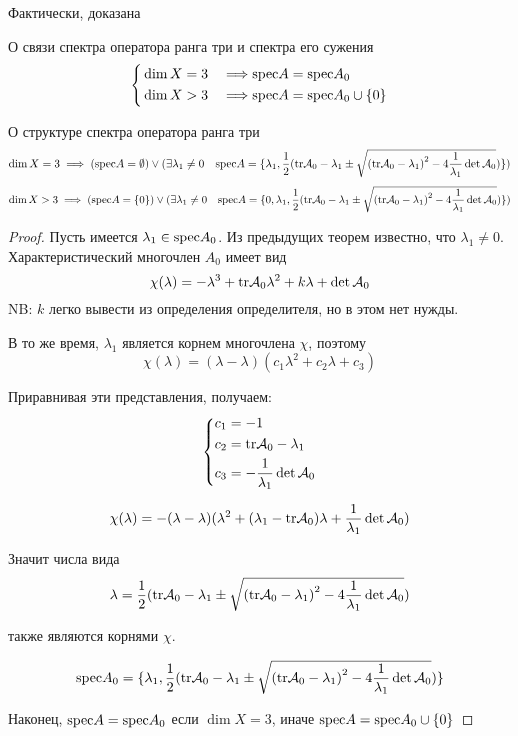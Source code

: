 Фактически, доказана
\begin{thm}{О связи спектра оператора ранга три и спектра его сужения}
  \begin{equation*}
    \left\{\begin{aligned}
      & \dim X = 3 & \implies & \mathrm{spec} A = \mathrm{spec} A_0 \\
      & \dim X > 3 & \implies & \mathrm{spec} A = \mathrm{spec} A_0 \cup \{0\}
    \end{aligned}\right.\end{equation*}
\end{thm}

\begin{thm}{О структуре спектра оператора ранга три}\*
  \label{thm:specstr}
  $$
  \dim X = 3 \implies
  (\mathrm{spec} A = \emptyset)
  \lor (\exists \lambda_1 \neq 0 \quad
  \mathrm{spec} A = \{\lambda_1,
    \frac{1}{2} (\mathrm{tr}\mathcal A_0 - \lambda_1
    \pm\sqrt{ {(\mathrm{tr}\mathcal A_0 - \lambda_1)}^2 - 4\frac{1}{\lambda_1} \det\mathcal A_0 })
  \})$$
  $$
  \dim X > 3 \implies
  (\mathrm{spec} A = \{0\})
  \lor (\exists \lambda_1 \neq 0 \quad
  \mathrm{spec} A = \{0, \lambda_1,
    \frac{1}{2} (\mathrm{tr}\mathcal A_0 - \lambda_1
    \pm\sqrt{ {(\mathrm{tr}\mathcal A_0 - \lambda_1)}^2 - 4\frac{1}{\lambda_1} \det\mathcal A_0 })
  \})$$
\end{thm}
\begin{proof}
  Пусть имеется $\lambda_1\in\mathrm{spec} A_0$.
  Из предыдущих теорем известно, что $\lambda_1\neq 0$.
  Характеристический многочлен $A_0$ имеет вид
  $$\chi(\lambda) = -\lambda^3 + \mathrm{tr}\mathcal A_0 \lambda^2 + k\lambda + \det\mathcal A_0$$
  NB: $k$ легко вывести из определения определителя, но в этом нет нужды.

  В то же время, $\lambda_1$ является корнем многочлена $\chi$, поэтому
  $$\chi(\lambda) = (\lambda - \lambda)(c_1 \lambda^2 + c_2 \lambda + c_3)$$

  Приравнивая эти представления, получаем:
  $$\left\{\begin{aligned}
    & c_1 = -1 \\
    & c_2 = \mathrm{tr}\mathcal A_0 - \lambda_1 \\
    & c_3 = - \frac{1}{\lambda_1} \det\mathcal A_0
  \end{aligned}\right.$$

  $$\chi(\lambda) = -(\lambda - \lambda)(\lambda^2 + (\lambda_1 - \mathrm{tr}\mathcal A_0) \lambda + \frac{1}{\lambda_1}\det\mathcal A_0)$$

  Значит числа вида
  $$\lambda =
  \frac{1}{2} (\mathrm{tr}\mathcal A_0 - \lambda_1
  \pm\sqrt{ {(\mathrm{tr}\mathcal A_0 - \lambda_1)}^2 - 4\frac{1}{\lambda_1} \det\mathcal A_0 }) $$

  также являются корнями $\chi$.

  $$\mathrm{spec} A_0 = \{\lambda_1,
    \frac{1}{2} (\mathrm{tr}\mathcal A_0 - \lambda_1
    \pm\sqrt{ {(\mathrm{tr}\mathcal A_0 - \lambda_1)}^2 - 4\frac{1}{\lambda_1} \det\mathcal A_0 })
  \}$$

  Наконец, $\mathrm{spec} A = \mathrm{spec} A_0$ если $\dim X = 3$, иначе $\mathrm{spec} A = \mathrm{spec} A_0 \cup \{ 0 \}$
\end{proof}

